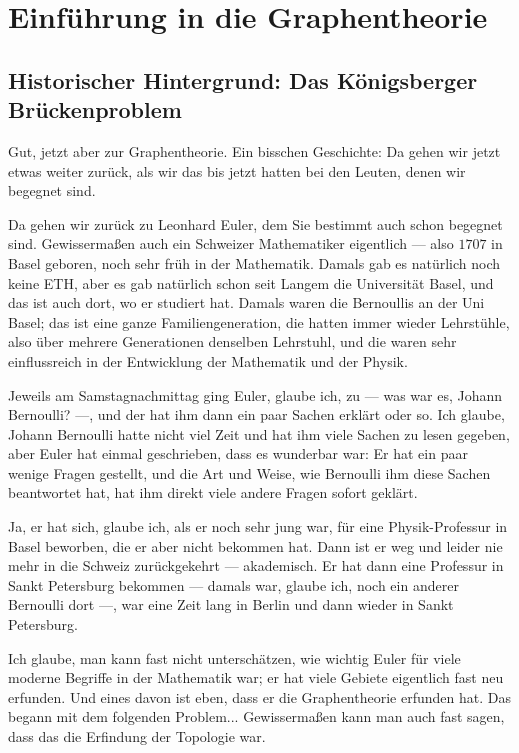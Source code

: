 \section{Einführung in die Graphentheorie}

\subsection{Historischer Hintergrund: Das Königsberger Brückenproblem}

\begin{spoken-clean}[00:03:08 - 00:05:40]
Gut, jetzt aber zur Graphentheorie. Ein bisschen Geschichte: Da gehen wir jetzt etwas weiter zurück, als wir das bis jetzt hatten bei den Leuten, denen wir begegnet sind.

Da gehen wir zurück zu Leonhard Euler, dem Sie bestimmt auch schon begegnet sind. Gewissermaßen auch ein Schweizer Mathematiker eigentlich --- also $1707$ in Basel geboren, noch sehr früh in der Mathematik. Damals gab es natürlich noch keine ETH, aber es gab natürlich schon seit Langem die Universität Basel, und das ist auch dort, wo er studiert hat. Damals waren die Bernoullis an der Uni Basel; das ist eine ganze Familiengeneration, die hatten immer wieder Lehrstühle, also über mehrere Generationen denselben Lehrstuhl, und die waren sehr einflussreich in der Entwicklung der Mathematik und der Physik.

Jeweils am Samstagnachmittag ging Euler, glaube ich, zu --- was war es, Johann Bernoulli? ---, und der hat ihm dann ein paar Sachen erklärt oder so. Ich glaube, Johann Bernoulli hatte nicht viel Zeit und hat ihm viele Sachen zu lesen gegeben, aber Euler hat einmal geschrieben, dass es wunderbar war: Er hat ein paar wenige Fragen gestellt, und die Art und Weise, wie Bernoulli ihm diese Sachen beantwortet hat, hat ihm direkt viele andere Fragen sofort geklärt.

Ja, er hat sich, glaube ich, als er noch sehr jung war, für eine Physik-Professur in Basel beworben, die er aber nicht bekommen hat. Dann ist er weg und leider nie mehr in die Schweiz zurückgekehrt --- akademisch. Er hat dann eine Professur in Sankt Petersburg bekommen --- damals war, glaube ich, noch ein anderer Bernoulli dort ---, war eine Zeit lang in Berlin und dann wieder in Sankt Petersburg.

Ich glaube, man kann fast nicht unterschätzen, wie wichtig Euler für viele moderne Begriffe in der Mathematik war; er hat viele Gebiete eigentlich fast neu erfunden. Und eines davon ist eben, dass er die Graphentheorie erfunden hat. Das begann mit dem folgenden Problem... Gewissermaßen kann man auch fast sagen, dass das die Erfindung der Topologie war.
\end{spoken-clean}

